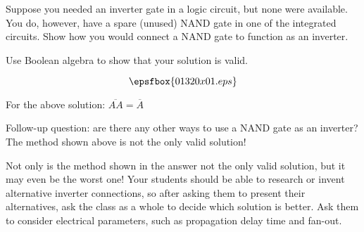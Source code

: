 

Suppose you needed an inverter gate in a logic circuit, but none were available.  You do, however, have a spare (unused) NAND gate in one of the integrated circuits.  Show how you would connect a NAND gate to function as an inverter.

Use Boolean algebra to show that your solution is valid.







$$\epsfbox{01320x01.eps}$$

For the above solution: $\overline{AA} = \overline{A}$

\vskip 10pt

Follow-up question: are there any other ways to use a NAND gate as an inverter?  The method shown above is not the only valid solution!







Not only is the method shown in the answer not the only valid solution, but it may even be the worst one!  Your students should be able to research or invent alternative inverter connections, so after asking them to present their alternatives, ask the class as a whole to decide which solution is better.  Ask them to consider electrical parameters, such as propagation delay time and fan-out.




